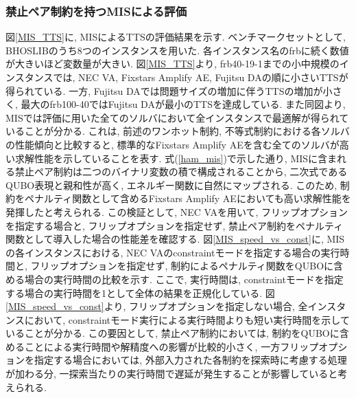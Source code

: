 \documentclass[submit,techrep,noauthor]{ipsj}
\begin{document}
\subsubsection{禁止ペア制約を持つMISによる評価}

図\ref{MIS_TTS}に, MISによるTTSの評価結果を示す. ベンチマークセットとして, BHOSLIB\cite{mislib}のうち8つのインスタンスを用いた. 各インスタンス名のfrbに続く数値が大きいほど変数量が大きい. 図\ref{MIS_TTS}より, frb40-19-1までの小中規模のインスタンスでは, NEC VA, Fixstars Amplify AE, Fujitsu DAの順に小さいTTSが得られている. 一方, Fujitsu DAでは問題サイズの増加に伴うTTSの増加が小さく, 最大のfrb100-40ではFujitsu DAが最小のTTSを達成している. また同図より, MISでは評価に用いた全てのソルバにおいて全インスタンスで最適解が得られていることが分かる. これは, 前述のワンホット制約, 不等式制約における各ソルバの性能傾向と比較すると, 標準的なFixstars Amplify AEを含む全てのソルバが高い求解性能を示していることを表す. 式(\ref{ham_mis})で示した通り, MISに含まれる禁止ペア制約は二つのバイナリ変数の積で構成されることから, 二次式であるQUBO表現と親和性が高く, エネルギー関数に自然にマップされる. このため, 制約をペナルティ関数として含めるFixstars Amplify AEにおいても高い求解性能を発揮したと考えられる. この検証として, NEC VAを用いて, フリップオプションを指定する場合と, フリップオプションを指定せず, 禁止ペア制約をペナルティ関数として導入した場合の性能差を確認する. 図\ref{MIS_speed_vs_const}に, MISの各インスタンスにおける, NEC VAのconstraintモードを指定する場合の実行時間と, フリップオプションを指定せず, 制約によるペナルティ関数をQUBOに含める場合の実行時間の比較を示す. ここで, 実行時間は, constraintモードを指定する場合の実行時間を1として全体の結果を正規化している. 図\ref{MIS_speed_vs_const}より, フリップオプションを指定しない場合, 全インスタンスにおいて, constraintモード実行による実行時間よりも短い実行時間を示していることが分かる. この要因として, 禁止ペア制約においては, 制約をQUBOに含めることによる実行時間や解精度への影響が比較的小さく, 一方フリップオプションを指定する場合においては, 外部入力された各制約を探索時に考慮する処理が加わる分, 一探索当たりの実行時間で遅延が発生することが影響していると考えられる.
\end{document}
